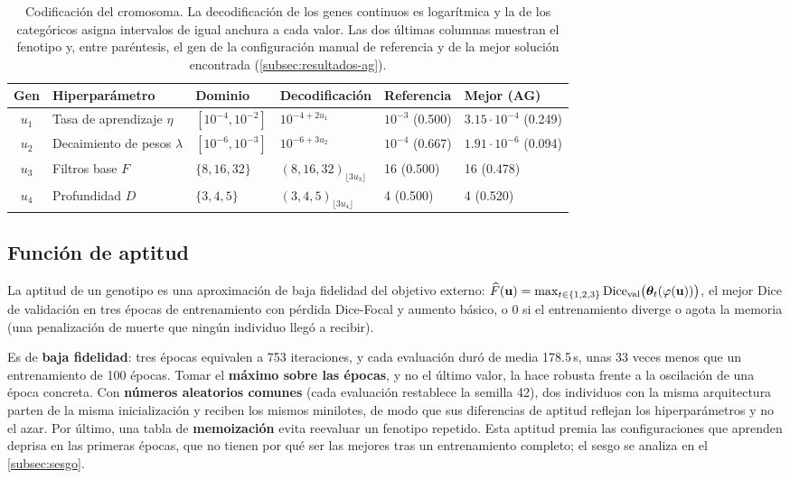 \begin{table}[htbp]
  \centering
  \caption{Codificación del cromosoma. La decodificación de los genes continuos es logarítmica y la de los categóricos asigna intervalos de igual anchura a cada valor. Las dos últimas columnas muestran el fenotipo y, entre paréntesis, el gen de la configuración manual de referencia y de la mejor solución encontrada (\cref{subsec:resultados-ag}).}
  \label{tab:genes}
  \small
  \setlength{\tabcolsep}{4pt}
  \begin{tabular}{clllll}
    \toprule
    \textbf{Gen} & \textbf{Hiperparámetro} & \textbf{Dominio} & \textbf{Decodificación} & \textbf{Referencia} & \textbf{Mejor (AG)} \\
    \midrule
    $u_1$ & Tasa de aprendizaje $\eta$ & $[10^{-4},10^{-2}]$ & $10^{-4+2u_1}$ & $10^{-3}$ (0.500) & $3.15\cdot10^{-4}$ (0.249) \\
    $u_2$ & Decaimiento de pesos $\lambda$ & $[10^{-6},10^{-3}]$ & $10^{-6+3u_2}$ & $10^{-4}$ (0.667) & $1.91\cdot10^{-6}$ (0.094) \\
    $u_3$ & Filtros base $F$ & $\{8,16,32\}$ & $(8,16,32)_{\lfloor 3u_3\rfloor}$ & 16 (0.500) & 16 (0.478) \\
    $u_4$ & Profundidad $D$ & $\{3,4,5\}$ & $(3,4,5)_{\lfloor 3u_4\rfloor}$ & 4 (0.500) & 4 (0.520) \\
    \bottomrule
  \end{tabular}
\end{table}

\subsection{Función de aptitud}\label{subsec:aptitud}

La aptitud de un genotipo es una aproximación de baja fidelidad del objetivo externo: $\widehat{F}(\mathbf{u})=\max_{t\in\{1,2,3\}} \operatorname{Dice}_{\mathrm{val}}\bigl(\bm{\theta}_t(\varphi(\mathbf{u}))\bigr)$, el mejor Dice de validación en tres épocas de entrenamiento con pérdida Dice-Focal y aumento básico, o $0$ si el entrenamiento diverge o agota la memoria (una penalización de muerte que ningún individuo llegó a recibir).

Es de \textbf{baja fidelidad}: tres épocas equivalen a 753 iteraciones, y cada evaluación duró de media 178.5\,s, unas 33 veces menos que un entrenamiento de 100 épocas. Tomar el \textbf{máximo sobre las épocas}, y no el último valor, la hace robusta frente a la oscilación de una época concreta. Con \textbf{números aleatorios comunes} (cada evaluación restablece la semilla 42), dos individuos con la misma arquitectura parten de la misma inicialización y reciben los mismos minilotes, de modo que sus diferencias de aptitud reflejan los hiperparámetros y no el azar. Por último, una tabla de \textbf{memoización} evita reevaluar un fenotipo repetido. Esta aptitud premia las configuraciones que aprenden deprisa en las primeras épocas, que no tienen por qué ser las mejores tras un entrenamiento completo; el sesgo se analiza en el \cref{subsec:sesgo}.

